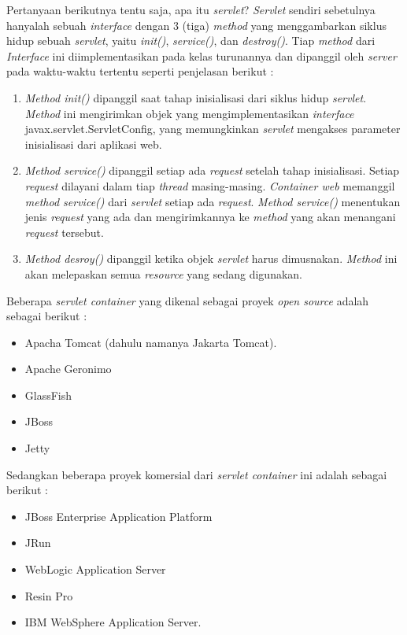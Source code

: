 \documentclass[pdftex,12pt, oneside]{article}
\begin{document}
\begin{enumerate}
\begin{enumerate}
  Pertanyaan berikutnya tentu saja, apa itu \textit{servlet}? \textit{Servlet} sendiri sebetulnya hanyalah sebuah \textit{interface} dengan 3 (tiga) \textit{method} yang menggambarkan siklus hidup sebuah \textit{servlet}, yaitu \textit{init()}, \textit{service()}, dan \textit{destroy()}. Tiap \textit{method} dari \textit{Interface} ini diimplementasikan pada kelas turunannya dan dipanggil oleh \textit{server} pada waktu-waktu tertentu seperti penjelasan berikut :
  
  \begin{enumerate}
    \item \textit{Method init()} dipanggil saat tahap inisialisasi dari siklus hidup \textit{servlet}. \textit{Method} ini mengirimkan objek yang mengimplementasikan \textit{interface} javax.servlet.ServletConfig, yang memungkinkan \textit{servlet} mengakses parameter inisialisasi dari aplikasi web.
    
    \item \textit{Method service()} dipanggil setiap ada \textit{request} setelah tahap inisialisasi. Setiap \textit{request} dilayani dalam tiap \textit{thread} masing-masing. \textit{Container web} memanggil \textit{method service()} dari \textit{servlet} setiap ada \textit{request}. \textit{Method service()} menentukan jenis \textit{request} yang ada dan mengirimkannya ke \textit{method} yang akan menangani \textit{request} tersebut.
    
    \item \textit{Method desroy()} dipanggil ketika objek \textit{servlet} harus dimusnakan. \textit{Method} ini akan melepaskan semua \textit{resource} yang sedang digunakan.
  \end{enumerate}
  
  Beberapa \textit{servlet container} yang dikenal sebagai proyek \textit{open source} adalah sebagai berikut :
  
  \begin{itemize}
    \item Apacha Tomcat (dahulu namanya Jakarta Tomcat).
    \item Apache Geronimo
    \item GlassFish
    \item JBoss
    \item Jetty
  \end{itemize}
  
  Sedangkan beberapa proyek komersial dari \textit{servlet container} ini adalah sebagai berikut :
  
  \begin{itemize}
    \item JBoss Enterprise Application Platform
    \item JRun
    \item WebLogic Application Server
    \item Resin Pro
    \item IBM WebSphere Application Server.
  \end{itemize}
  

\end{enumerate}
\end{enumerate}
\end{document}

